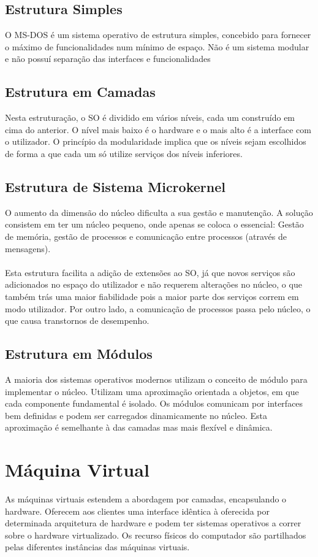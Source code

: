 \documentclass[10pt,a4paper]{report}
\begin{document}
\subsection{Estrutura Simples}
O MS-DOS é um sistema operativo de estrutura simples, concebido para fornecer o máximo de funcionalidades num mínimo de espaço. Não é um sistema modular e não possuí separação das interfaces e funcionalidades
\subsection{Estrutura em Camadas}
Nesta estruturação, o SO é dividido em vários níveis, cada um construído em cima do anterior. O nível mais baixo é o hardware e o mais alto é a interface com o utilizador. O princípio da modularidade implica que os níveis sejam escolhidos de forma a que cada um só utilize serviços dos níveis inferiores.
\subsection{Estrutura de Sistema Microkernel}
O aumento da dimensão do núcleo dificulta a sua gestão e manutenção. A solução consistem em ter um núcleo pequeno, onde apenas se coloca o essencial: Gestão de memória, gestão de processos e comunicação entre processos (através de mensagens).\\
\\
Esta estrutura facilita a adição de extensões ao SO, já que novos serviços são adicionados no espaço do utilizador e não requerem alterações no núcleo, o que também trás uma maior fiabilidade pois a maior parte dos serviços correm em modo utilizador. Por outro lado, a comunicação de processos passa pelo núcleo, o que causa transtornos de desempenho.
\subsection{Estrutura em Módulos}
A maioria dos sistemas operativos modernos utilizam o conceito de módulo para implementar o núcleo. Utilizam uma aproximação orientada a objetos, em que cada componente fundamental é isolado. Os módulos comunicam por interfaces bem definidas e podem ser carregados dinamicamente no núcleo. Esta aproximação é semelhante à das camadas mas mais flexível e dinâmica.
\section{Máquina Virtual}
As máquinas virtuais estendem a abordagem por camadas, encapsulando o hardware. Oferecem aos clientes uma interface idêntica à oferecida por determinada arquitetura de hardware e podem ter sistemas operativos a correr sobre o hardware virtualizado. Os recurso físicos do computador são partilhados pelas diferentes instâncias das máquinas virtuais.
\end{document}
